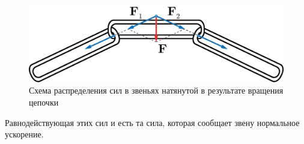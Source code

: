 \documentclass[14pt,a4paper,twoside]{extarticle}	%
\begin{document}
\begin{figure}[H] 	
	\centering 	
	\includegraphics[width=0.75\linewidth]{chain-3.png}
	\caption{Схема распределения сил в звеньях натянутой в результате вращения цепочки}
	\label{chain-3}
\end{figure}
	
Равнодействующая этих сил и есть та сила, которая сообщает звену нормальное ускорение.
		
		
		
	
\end{document}
